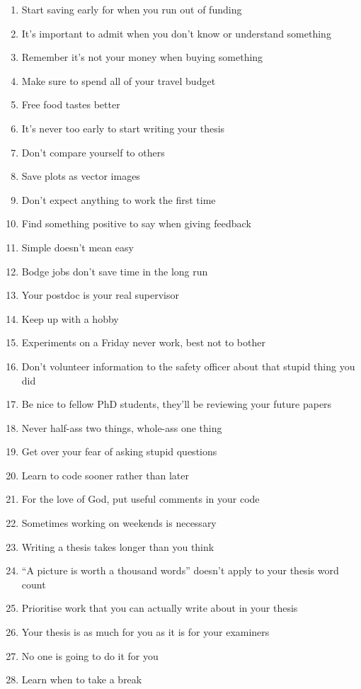 \begin{enumerate}
	\item Start saving early for when you run out of funding 
	\item It's important to admit when you don't know or understand something
	\item Remember it's not your money when buying something
	\item Make sure to spend all of your travel budget
	\item Free food tastes better
	\item It's never too early to start writing your thesis
	\item Don't compare yourself to others
	\item Save plots as vector images
	\item Don't expect anything to work the first time
	\item Find something positive to say when giving feedback
	\item Simple doesn't mean easy
	\item Bodge jobs don't save time in the long run
	\item Your postdoc is your real supervisor
	\item Keep up with a hobby
	\item Experiments on a Friday never work, best not to bother
	\item Don't volunteer information to the safety officer about that stupid thing you did 
	\item Be nice to fellow PhD students, they'll be reviewing your future papers
	\item Never half-ass two things, whole-ass one thing
	\item Get over your fear of asking stupid questions
	\item Learn to code sooner rather than later
	\item For the love of God, put useful comments in your code
	\item Sometimes working on weekends is necessary
	\item Writing a thesis takes longer than you think
	\item ``A picture is worth a thousand words'' doesn't apply to your thesis word count
	\item Prioritise work that you can actually write about in your thesis
	\item Your thesis is as much for you as it is for your examiners 
	\item No one is going to do it for you
	\item Learn when to take a break

\end{enumerate}
